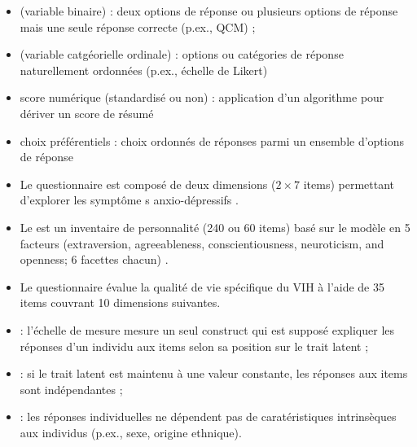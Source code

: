 
\begin{itemize}
\item {} (variable binaire) : deux options de réponse
  ou plusieurs options de réponse mais une seule réponse correcte (p.ex., QCM) ;
\item {} (variable catgéorielle ordinale) : options ou
  catégories de réponse naturellement ordonnées (p.ex., échelle de Likert)
\item score numérique (standardisé ou non) : application d'un algorithme pour
  dériver un score de résumé
\item choix préférentiels : choix ordonnés de réponses parmi un ensemble
  d'options de réponse
\end{itemize}


\begin{itemize}
\item Le questionnaire  est composé de deux dimensions ($2\times
  7$ items) permettant d'explorer les symptôme s
  anxio-dépressifs \autocite{Zigmond1983}.
\item Le  est un inventaire de personnalité (240 ou 60 items)
  basé sur le modèle en 5 facteurs (extraversion, agreeableness,
  conscientiousness, neuroticism, and openness; 6 facettes chacun)
  \autocite{McCrae1992}.
\item Le questionnaire  évalue la qualité de vie spécifique
  du VIH à l'aide de 35 items couvrant 10 dimensions suivantes\autocite{Wu1997a}.
\end{itemize}



\begin{itemize}
\item {} : l'échelle de mesure mesure un seul
  construct qui est supposé expliquer les réponses d'un individu aux items selon
  sa position sur le trait latent ;
\item {} : si le trait latent est maintenu à une
  valeur constante, les réponses aux items sont indépendantes ;
\item {} : les réponses individuelles ne dépendent
  pas de caratéristiques intrinsèques aux individus (p.ex., sexe, origine ethnique).
\end{itemize}

